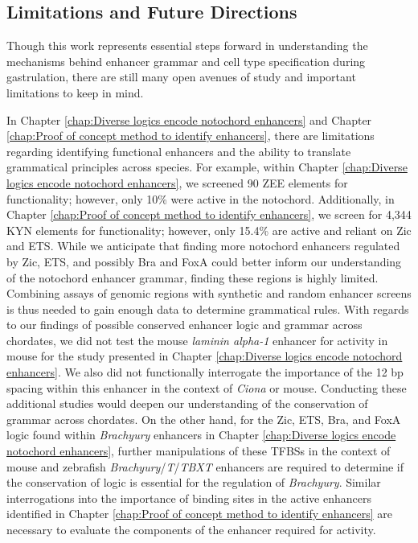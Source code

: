 \begin{dissertationepilogue}
    \section{Limitations and Future Directions}
    Though this work represents essential steps forward in understanding the mechanisms behind enhancer grammar and cell type specification during gastrulation, there are still many open avenues of study and important limitations to keep in mind.

    In Chapter \ref{chap:Diverse logics encode notochord enhancers} and Chapter \ref{chap:Proof of concept method to identify enhancers}, there are limitations regarding identifying functional enhancers and the ability to translate grammatical principles across species. For example, within Chapter \ref{chap:Diverse logics encode notochord enhancers}, we screened 90 ZEE elements for functionality; however, only 10\% were active in the notochord. Additionally, in Chapter \ref{chap:Proof of concept method to identify enhancers}, we screen for 4,344 KYN elements for functionality; however, only 15.4\% are active and reliant on Zic and ETS. While we anticipate that finding more notochord enhancers regulated by Zic, ETS, and possibly Bra and FoxA could better inform our understanding of the notochord enhancer grammar, finding these regions is highly limited. Combining assays of genomic regions with synthetic and random enhancer screens is thus needed to gain enough data to determine grammatical rules. With regards to our findings of possible conserved enhancer logic and grammar across chordates, we did not test the mouse \textit{laminin alpha-1} enhancer for activity in mouse for the study presented in Chapter \ref{chap:Diverse logics encode notochord enhancers}. We also did not functionally interrogate the importance of the 12 bp spacing within this enhancer in the context of \textit{Ciona} or mouse. Conducting these additional studies would deepen our understanding of the conservation of grammar across chordates. On the other hand, for the Zic, ETS, Bra, and FoxA logic found within \textit{Brachyury} enhancers in Chapter \ref{chap:Diverse logics encode notochord enhancers}, further manipulations of these TFBSs in the context of mouse and zebrafish \textit{Brachyury}/\textit{T}/\textit{TBXT} enhancers are required to determine if the conservation of logic is essential for the regulation of \textit{Brachyury}. Similar interrogations into the importance of binding sites in the active enhancers identified in Chapter \ref{chap:Proof of concept method to identify enhancers} are necessary to evaluate the components of the enhancer required for activity. 


\end{dissertationepilogue}
